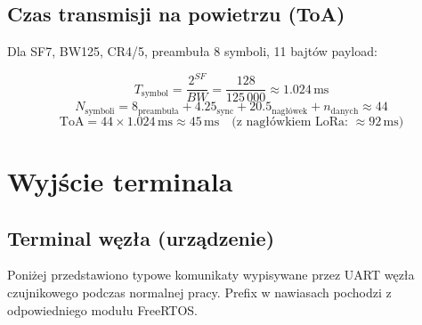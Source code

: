 \documentclass[12pt,a4paper]{article}
\newcommand{\qty}[2]{#1\,\ensuremath{#2}}
\newcommand{\milli}{\mathrm{m}}
\newcommand{\second}{\mathrm{s}}
\begin{document}
\subsection{Czas transmisji na powietrzu (ToA)}

Dla SF7, BW125, CR4/5, preambuła 8 symboli, 11 bajtów payload:

\[
  T_{\text{symbol}} = \frac{2^{SF}}{BW} = \frac{128}{125\,000} \approx \qty{1.024}{\milli\second}
\]
\[
  N_{\text{symboli}} = 8_{\text{preambuła}} + 4.25_{\text{sync}} + 20.5_{\text{nagłówek}} + n_{\text{danych}} \approx 44
\]
\[
  \text{ToA} = 44 \times \qty{1.024}{\milli\second} \approx \qty{45}{\milli\second}
  \quad \text{(z nagłówkiem LoRa: }\approx\qty{92}{\milli\second}\text{)}
\]

\section{Wyjście terminala}

\subsection{Terminal węzła (urządzenie)}

Poniżej przedstawiono typowe komunikaty wypisywane przez UART węzła
czujnikowego podczas normalnej pracy. Prefix w nawiasach pochodzi
z odpowiedniego modułu FreeRTOS.
\end{document}
